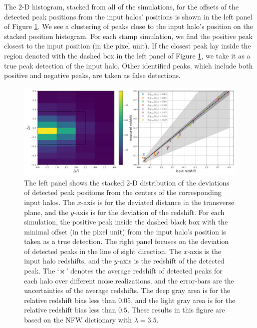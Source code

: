 The $2$-D histogram, stacked from all of the simulations, for the offsets of
the detected peak positions from the input halos' positions is shown in the
left panel of Figure \ref{fig_detoffsets}. We see a clustering of peaks close
to the input halo's position on the stacked position histogram.  For each stamp
simulation, we find the positive peak closest to the input position (in the
pixel unit). If the closest peak lay inside the region denoted with the dashed
box in the left panel of Figure \ref{fig_detoffsets}, we take it as a true peak
detection of the input halo. Other identified peaks, which include both positive
and negative peaks, are taken as false detections.

\begin{figure}
 \centering
 \includegraphics[width=1.0\textwidth]{peak_scatters_NFW_lbd35.pdf}
 \caption{The left panel shows the stacked $2$-D distribution of the deviations
     of detected peak positions from the centers of the corresponding input
     halos. The $x$-axis is for the deviated distance in the transverse plane,
     and the $y$-axis is for the deviation of the redshift. For each
     simulation, the positive peak inside the dashed black box with the minimal
     offset (in the pixel unit) from the input halo's position is taken as a
     true detection. The right panel focuses on the deviation of detected peaks
     in the line of sight direction. The $x$-axis is the input halo redshifts,
     and the $y$-axis is the redshift of the detected peak. The `$\cross$'
     denotes the average redshift of detected peaks for each halo over
     different noise realizations, and the error-bars are the uncertainties of
     the average redshifts. The deep gray area is for the relative redshift
     bias less than $0.05$, and the light gray area is for the relative
     redshift bias less than $0.5$. These results in this figure are based on
     the NFW dictionary with $\lambda=3.5$.
     } \label{fig_detoffsets}
\end{figure}

